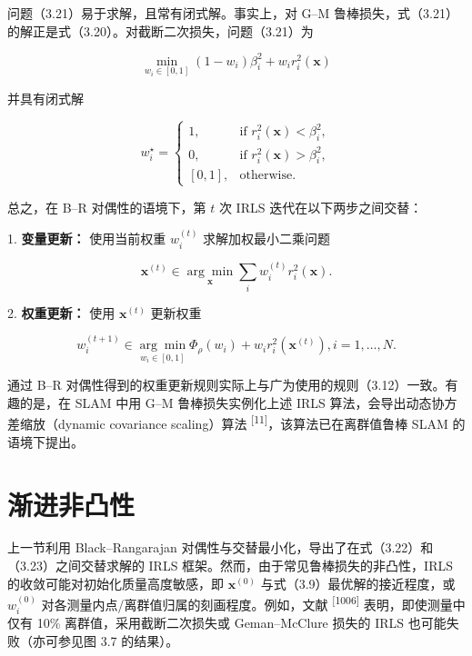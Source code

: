 问题（3.21）易于求解，且常有闭式解。事实上，对 G–M 鲁棒损失，式（3.21）的解正是式（3.20）。对截断二次损失，问题（3.21）为

\begin{equation*}
\min _ {w _ {i} \in [ 0, 1 ]} (1 - w _ {i}) \beta_ {i} ^ {2} + w _ {i} r _ {i} ^ {2} (\boldsymbol {x})
\end{equation*}

并具有闭式解

\begin{equation*}
w _ {i} ^ {\star} = \begin{cases} 1, & \text{if } r _ {i} ^ {2} (\boldsymbol {x}) < \beta _ {i} ^ {2}, \\ 0, & \text{if } r _ {i} ^ {2} (\boldsymbol {x}) > \beta _ {i} ^ {2}, \\ [0, 1], & \text{otherwise}. \end{cases}
\end{equation*}

总之，在 B–R 对偶性的语境下，第 $t$ 次 IRLS 迭代在以下两步之间交替：

1. \textbf{变量更新：} 使用当前权重 $w _ { i } ^ { ( t ) }$ 求解加权最小二乘问题

\begin{equation}
\boldsymbol {x} ^ {(t)} \in \underset {\boldsymbol {x}} {\arg \min} \sum_ {i} w _ {i} ^ {(t)} r _ {i} ^ {2} (\boldsymbol {x}).\tag{3.22}
\end{equation}

2. \textbf{权重更新：} 使用 $\mathbf { \boldsymbol { x } } ^ { ( t ) }$ 更新权重

\begin{equation}
w _ {i} ^ {(t + 1)} \in \underset {w _ {i} \in [ 0, 1 ]} {\arg \min} \Phi_ {\rho} (w _ {i}) + w _ {i} r _ {i} ^ {2} (\boldsymbol {x} ^ {(t)}), i = 1, \ldots , N.\tag{3.23}
\end{equation}

通过 B–R 对偶性得到的权重更新规则实际上与广为使用的规则（3.12）一致。有趣的是，在 SLAM 中用 G–M 鲁棒损失实例化上述 IRLS 算法，会导出动态协方差缩放（dynamic covariance scaling）算法 \textsuperscript{[11]}，该算法已在离群值鲁棒 SLAM 的语境下提出。

\section{渐进非凸性}

上一节利用 Black–Rangarajan 对偶性与交替最小化，导出了在式（3.22）和（3.23）之间交替求解的 IRLS 框架。然而，由于常见鲁棒损失的非凸性，IRLS 的收敛可能对初始化质量高度敏感，即 $\mathbf { x } ^ { ( 0 ) }$ 与式（3.9）最优解的接近程度，或 $w _ { i } ^ { ( 0 ) }$ 对各测量内点/离群值归属的刻画程度。例如，文献 \textsuperscript{[1006]} 表明，即使测量中仅有 10\% 离群值，采用截断二次损失或 Geman–McClure 损失的 IRLS 也可能失败（亦可参见图 3.7 的结果）。

